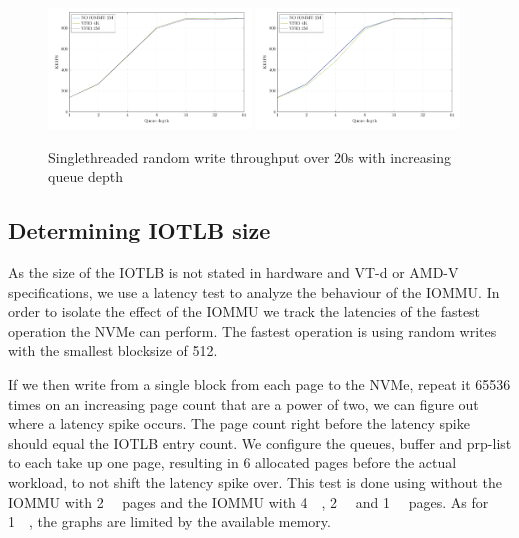 \begin{figure}[H]
  \centering
   {\includegraphics[width=0.48\textwidth]{figures/qdnt1_1page}}
   {\includegraphics[width=0.48\textwidth]{figures/qdnt1_512page}}
  \caption{Singlethreaded random write throughput over 20s with increasing queue depth}
  \label{fig:qdnt1_4kib}
\end{figure}

\subsection{Determining IOTLB size}
As the size of the IOTLB is not stated in hardware and VT-d or AMD-V specifications, we use a latency test to analyze the behaviour of the IOMMU.
In order to isolate the effect of the IOMMU we track the latencies of the fastest operation the NVMe can perform. The fastest operation is using random writes with the smallest blocksize of \qty{512}{\byte}.

If we then write from a single block from each page to the NVMe, repeat it 65536 times on an increasing page count that are a power of two, we can figure out where a latency spike occurs. The page count right before the latency spike should equal the IOTLB entry count. We configure the queues, buffer and prp-list to each take up one page, resulting in 6 allocated pages before the actual workload, to not shift the latency spike over. This test is done using without the IOMMU with \qty{2}{\mebi\byte} pages and the IOMMU with \qty{4}{\kibi\byte}, \qty{2}{\mebi\byte} and \qty{1}{\gibi\byte} pages. As for \qty{1}{\gibi\byte}, the graphs are limited by the available memory.

